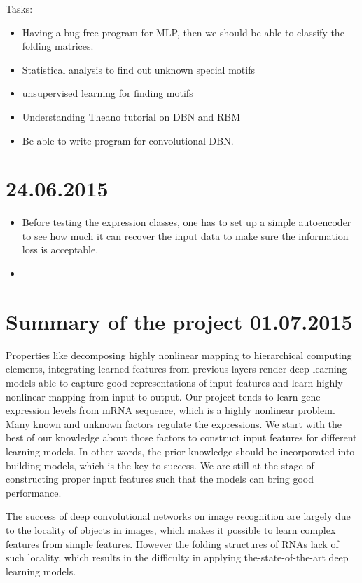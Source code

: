 \documentclass[paper=a4, fontsize=12pt]{scrartcl}	%
\numberwithin{equation}{section}					%
\numberwithin{figure}{section}					%
\numberwithin{table}{section}					%
\begin{document}
Tasks:
\begin{itemize}
\item Having a bug free program for MLP, then we should be able to classify the folding matrices.
\item Statistical analysis to find out unknown special motifs
\item unsupervised learning for finding motifs
\item Understanding Theano tutorial on DBN and RBM
\item Be able to write program for convolutional DBN.
\end{itemize}

\section*{24.06.2015}
\begin{itemize}
\item Before testing the expression classes, one has to set up a simple autoencoder to see how much it can recover the input data to make sure the information loss is acceptable. 
\item 
\end{itemize}

\section{Summary of the project 01.07.2015}
Properties like decomposing highly nonlinear mapping to hierarchical computing elements, integrating learned features from previous layers render deep learning models able to capture good representations of input features and learn highly nonlinear mapping from input to output. Our project tends to learn gene expression levels from mRNA sequence, which is a highly nonlinear problem. Many known and unknown factors regulate the expressions. We start with the best of our knowledge about those factors to construct input features for different learning models. In other words, the prior knowledge should be incorporated into building models, which is the key to success. We are still at the stage of constructing proper input features such that the models can bring good performance. 

The success of deep convolutional networks on image recognition are largely due to the locality of objects in images, which makes it possible to learn complex features from simple features. However the folding structures of RNAs lack of such locality, which results in the difficulty in applying the-state-of-the-art deep learning models. 
\end{document}
